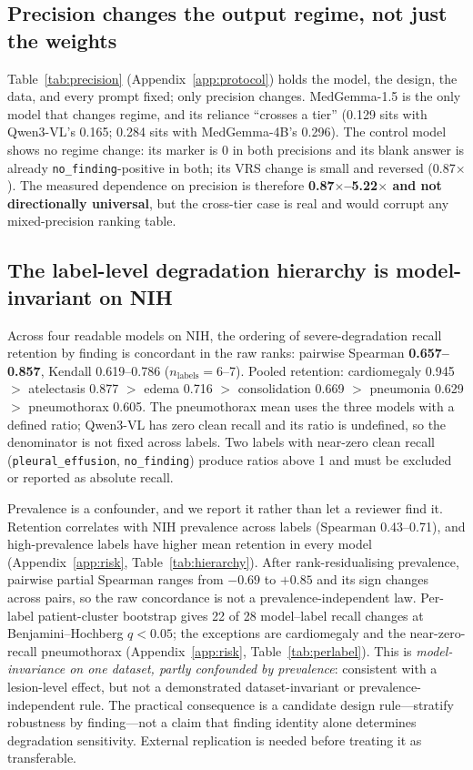 \subsection{Precision changes the output regime, not just the weights}
\label{sec:results-precision}

Table~\ref{tab:precision} (Appendix~\ref{app:protocol}) holds the model, the design, the data, and every prompt fixed; only precision changes. MedGemma-1.5 is the only model that changes regime, and its reliance ``crosses a tier'' (0.129 sits with Qwen3-VL's 0.165; 0.284 sits with MedGemma-4B's 0.296). The control model shows no regime change: its marker is 0 in both precisions and its blank answer is already \texttt{no\_finding}-positive in both; its VRS change is small and reversed (0.87$\times$). The measured dependence on precision is therefore \textbf{0.87$\times$--5.22$\times$ and not directionally universal}, but the cross-tier case is real and would corrupt any mixed-precision ranking table.

\subsection{The label-level degradation hierarchy is model-invariant on NIH}
\label{sec:results-labels}

Across four readable models on NIH, the ordering of severe-degradation recall retention by finding is concordant in the raw ranks: pairwise Spearman \textbf{0.657--0.857}, Kendall 0.619--0.786 ($n_{\text{labels}}=6$--7). Pooled retention: cardiomegaly 0.945 $>$ atelectasis 0.877 $>$ edema 0.716 $>$ consolidation 0.669 $>$ pneumonia 0.629 $>$ pneumothorax 0.605. The pneumothorax mean uses the three models with a defined ratio; Qwen3-VL has zero clean recall and its ratio is undefined, so the denominator is not fixed across labels. Two labels with near-zero clean recall (\texttt{pleural\_effusion}, \texttt{no\_finding}) produce ratios above 1 and must be excluded or reported as absolute recall.

Prevalence is a confounder, and we report it rather than let a reviewer find it. Retention correlates with NIH prevalence across labels (Spearman 0.43--0.71), and high-prevalence labels have higher mean retention in every model (Appendix~\ref{app:risk}, Table~\ref{tab:hierarchy}). After rank-residualising prevalence, pairwise partial Spearman ranges from $-0.69$ to $+0.85$ and its sign changes across pairs, so the raw concordance is not a prevalence-independent law. Per-label patient-cluster bootstrap gives 22 of 28 model--label recall changes at Benjamini--Hochberg $q<0.05$; the exceptions are cardiomegaly and the near-zero-recall pneumothorax (Appendix~\ref{app:risk}, Table~\ref{tab:perlabel}). This is \emph{model-invariance on one dataset, partly confounded by prevalence}: consistent with a lesion-level effect, but not a demonstrated dataset-invariant or prevalence-independent rule. The practical consequence is a candidate design rule---stratify robustness by finding---not a claim that finding identity alone determines degradation sensitivity. External replication is needed before treating it as transferable.

